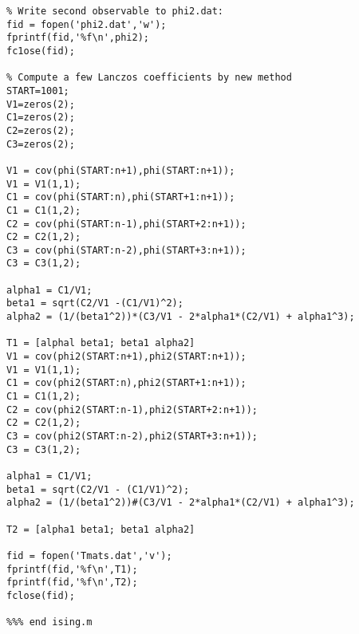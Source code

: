\documentclass[12pt,letterpaper]{report}
\theoremstyle{plain}
\theoremstyle{definition}
\theoremstyle{remark}
\numberwithin{theorem}{chapter}
\numberwithin{claim}{chapter}
\numberwithin{equation}{chapter}
\numberwithin{conjecture}{chapter}
\newcommand\<{\ensuremath{\langle}}
\renewcommand\>{\ensuremath{\rangle}}
\begin{document}
{\begin{verbatim}
% Write second observable to phi2.dat:
fid = fopen('phi2.dat','w');
fprintf(fid,'%f\n',phi2);
fc1ose(fid);

% Compute a few Lanczos coefficients by new method
START=1001;
V1=zeros(2);
C1=zeros(2);
C2=zeros(2);
C3=zeros(2);

V1 = cov(phi(START:n+1),phi(START:n+1));
V1 = V1(1,1);
C1 = cov(phi(START:n),phi(START+1:n+1));
C1 = C1(1,2);
C2 = cov(phi(START:n-1),phi(START+2:n+1));
C2 = C2(1,2);
C3 = cov(phi(START:n-2),phi(START+3:n+1));
C3 = C3(1,2);

alpha1 = C1/V1;
beta1 = sqrt(C2/V1 -(C1/V1)^2);
alpha2 = (1/(beta1^2))*(C3/V1 - 2*alpha1*(C2/V1) + alpha1^3);

T1 = [alphal beta1; beta1 alpha2]
V1 = cov(phi2(START:n+1),phi2(START:n+1));
V1 = V1(1,1);
C1 = cov(phi2(START:n),phi2(START+1:n+1));
C1 = C1(1,2);
C2 = cov(phi2(START:n-1),phi2(START+2:n+1));
C2 = C2(1,2);
C3 = cov(phi2(START:n-2),phi2(START+3:n+1));
C3 = C3(1,2);

alpha1 = C1/V1;
beta1 = sqrt(C2/V1 - (C1/V1)^2);
alpha2 = (1/(beta1^2))#(C3/V1 - 2*alpha1*(C2/V1) + alpha1^3);

T2 = [alpha1 beta1; beta1 alpha2]

fid = fopen('Tmats.dat','v');
fprintf(fid,'%f\n',T1);
fprintf(fid,'%f\n',T2);
fclose(fid);

%%% end ising.m

\end{verbatim}}
\end{document}
